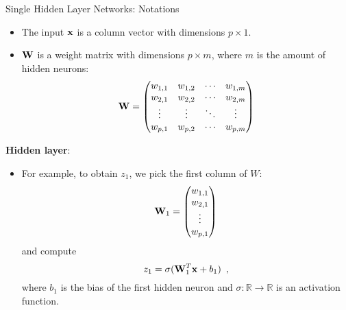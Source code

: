 \begin{vbframe}{Single Hidden Layer Networks: Notations}

\begin{itemize}
\item The input $\mathbf{x}$ is a column vector with dimensions $p \times 1$. 
\item $\mathbf{W}$ is a weight matrix with dimensions $p \times m$, where $m$ is the amount of hidden neurons:
$$\mathbf{W} =
     \begin{pmatrix}
      w_{1,1} & w_{1,2} & \cdots & w_{1,m} \\
      w_{2,1} & w_{2,2} & \cdots & w_{2,m} \\
      \vdots  & \vdots  & \ddots & \vdots  \\
      w_{p,1} & w_{p,2} & \cdots & w_{p,m}
     \end{pmatrix}$$
     \end{itemize}
     \framebreak
     \textbf{Hidden layer}:
     \begin{itemize}
\item For example, to obtain $z_1$, we pick the first column of $W$:
    $$\mathbf{W}_1 =
     \begin{pmatrix}
      w_{1,1} \\
      w_{2,1} \\
      \vdots  \\
      w_{p,1}
     \end{pmatrix}$$
and compute 
$$z_1 = \sigma(\mathbf{W}_1^T \mathbf{x} + b_1)\enspace,$$
 where $b_1$ is the bias of the first hidden neuron and $\sigma: \mathbb{R} \to \mathbb{R}$ is an activation function. 
\end{itemize}
\end{vbframe}

